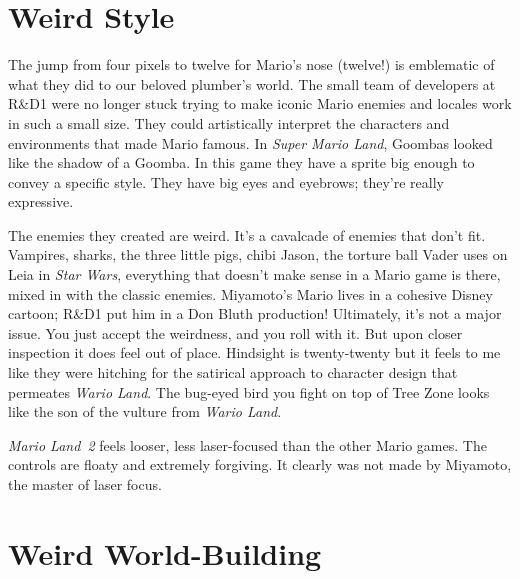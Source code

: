 \documentclass{book}
\begin{document}
\FloatBarrier\section*{Weird Style}
The jump from four pixels to twelve for Mario’s nose (twelve!) is emblematic of what they did to our beloved plumber’s world. The small team of developers at R\&D1 were no longer stuck trying to make iconic Mario enemies and locales work in such a small size. They could artistically interpret the characters and environments that made Mario famous. In \emph{Super Mario Land}, Goombas looked like the shadow of a Goomba. In this game they have a sprite big enough to convey a specific style. They have big eyes and eyebrows; they’re really expressive.\par
\FloatBarrier\vspace{\baselineskip}\begin{figure}[H]\end{figure}
The enemies they created are weird. It’s a cavalcade of enemies that don’t fit. Vampires, sharks, the three little pigs, chibi Jason, the torture ball Vader uses on Leia in \emph{Star Wars}, everything that doesn’t make sense in a Mario game is there, mixed in with the classic enemies. Miyamoto’s Mario lives in a cohesive Disney cartoon; R\&D1 put him in a Don Bluth production! Ultimately, it’s not a major issue. You just accept the weirdness, and you roll with it. But upon closer inspection it does feel out of place. Hindsight is twenty-twenty but it feels to me like they were hitching for the satirical approach to character design that permeates \emph{Wario Land}. The bug-eyed bird you fight on top of Tree Zone looks like the son of the vulture from \emph{Wario Land}.\par
\FloatBarrier\vspace{\baselineskip}\begin{figure}[H]\end{figure}
\emph{Mario Land~2} feels looser, less laser-focused than the other Mario games. The controls are floaty and extremely forgiving. It clearly was not made by Miyamoto, the master of laser focus.\par
\FloatBarrier\section*{Weird World-Building}
\end{document}
